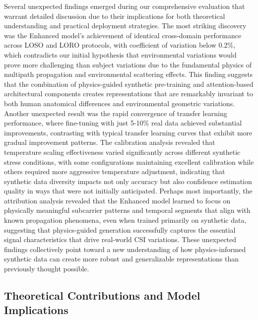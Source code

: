 \documentclass[journal]{IEEEtran}
\begin{document}
Several unexpected findings emerged during our comprehensive evaluation that warrant detailed discussion due to their implications for both theoretical understanding and practical deployment strategies. The most striking discovery was the Enhanced model's achievement of identical cross-domain performance across LOSO and LORO protocols, with coefficient of variation below 0.2\%, which contradicts our initial hypothesis that environmental variations would prove more challenging than subject variations due to the fundamental physics of multipath propagation and environmental scattering effects. This finding suggests that the combination of physics-guided synthetic pre-training and attention-based architectural components creates representations that are remarkably invariant to both human anatomical differences and environmental geometric variations. Another unexpected result was the rapid convergence of transfer learning performance, where fine-tuning with just 5-10\% real data achieved substantial improvements, contrasting with typical transfer learning curves that exhibit more gradual improvement patterns. The calibration analysis revealed that temperature scaling effectiveness varied significantly across different synthetic stress conditions, with some configurations maintaining excellent calibration while others required more aggressive temperature adjustment, indicating that synthetic data diversity impacts not only accuracy but also confidence estimation quality in ways that were not initially anticipated. Perhaps most importantly, the attribution analysis revealed that the Enhanced model learned to focus on physically meaningful subcarrier patterns and temporal segments that align with known propagation phenomena, even when trained primarily on synthetic data, suggesting that physics-guided generation successfully captures the essential signal characteristics that drive real-world CSI variations. These unexpected findings collectively point toward a new understanding of how physics-informed synthetic data can create more robust and generalizable representations than previously thought possible.

\subsection{Theoretical Contributions and Model Implications}
\end{document}
